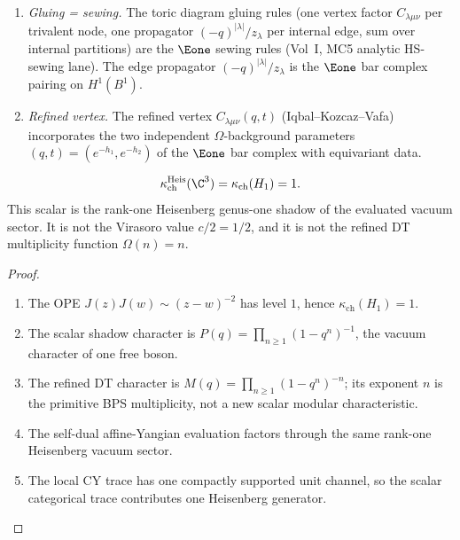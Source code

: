 \begin{proposition}
\begin{enumerate}[label=\textup{(\alph*)}]
 \item \emph{Gluing = sewing.} The toric diagram gluing rules (one vertex factor $C_{\lambda\mu\nu}$ per trivalent node, one propagator $(-q)^{|\lambda|}/z_\lambda$ per internal edge, sum over internal partitions) are the $\Eone$ sewing rules (Vol~I, MC5 analytic HS-sewing lane). The edge propagator $(-q)^{|\lambda|}/z_\lambda$ is the $\Eone$ bar complex pairing on $H^1(B^1)$.
 \item \emph{Refined vertex.} The refined vertex $C_{\lambda\mu\nu}(q,t)$ (Iqbal--Kozcaz--Vafa) incorporates the two independent $\Omega$-background parameters $(q,t) = (e^{-h_1}, e^{-h_2})$ of the $\Eone$ bar complex with equivariant data.
\end{enumerate}
\end{proposition}


\begin{theorem}
\label{thm:kappa-c3}
\[
 \kappa_{\mathrm{ch}}^{\mathrm{Heis}}(\C^3)
 = \kappa_{\mathrm{ch}}(H_1)=1 .
\]
This scalar is the rank-one Heisenberg genus-one shadow of the evaluated
vacuum sector. It is not the Virasoro value \(c/2=1/2\), and it is not
the refined DT multiplicity function \(\Omega(n)=n\).
\begin{proof}
\begin{enumerate}[label=\textup{(\alph*)}]
 \item The OPE \(J(z)J(w)\sim (z-w)^{-2}\) has level \(1\), hence
 \(\kappa_{\mathrm{ch}}(H_1)=1\).
 \item The scalar shadow character is
 \(P(q)=\prod_{n\geq 1}(1-q^n)^{-1}\), the vacuum character of one
 free boson.
 \item The refined DT character is
 \(M(q)=\prod_{n\geq 1}(1-q^n)^{-n}\); its exponent \(n\) is the
 primitive BPS multiplicity, not a new scalar modular characteristic.
 \item The self-dual affine-Yangian evaluation factors through the same
 rank-one Heisenberg vacuum sector.
 \item The local CY trace has one compactly supported unit channel, so
 the scalar categorical trace contributes one Heisenberg generator.
\end{enumerate}
\end{proof}
\end{theorem}


